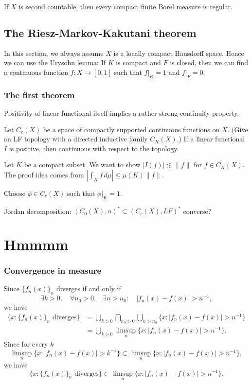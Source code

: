 \documentclass{../crs}
\begin{document}
\begin{thm}
If $X$ is second countable, then every compact finite Borel measure is regular.
\end{thm}




\section{The Riesz-Markov-Kakutani theorem}
In this section, we always assume $X$ is a locally compact Hausdorff space.
Hence we can use the Urysohn lemma: If $K$ is compact and $F$ is closed, then we can find a continuous function $f:X\to[0,1]$ such that $f|_K=1$ and $f|_F=0$.
\subsection{The first theorem}
Positivity of linear functional itself implies a rather strong continuity property.
\begin{thm}
Let $C_c(X)$ be a space of compactly supported continuous functions on $X$.
(Give an LF topology with a directed inductive family $C_K(X)$.)
If a linear functional $I$ is positive, then continuous with respect to the topology.
\end{thm}
\begin{pf}
Let $K$ be a compact subset.
We want to show $|I(f)|\lesssim\|f\|$ for $f\in C_K(X)$.
The proof idea comes from $|\int_K f\,d\mu|\le\mu(K)\|f\|$.

Choose $\phi\in C_c(X)$ such that $\phi|_K=1$.
\end{pf}





Jordan decomposition: $(C_0(X),u)^*\subset(C_c(X),LF)^*$
converse?




\chapter{Hmmmm}

\subsection{Convergence in measure}
Since $\{f_n(x)\}_n$ diverges if and only if
\[\exists k>0,\quad\forall n_0>0.\quad\exists n>n_0:\quad |f_n(x)-f(x)|>n^{-1},\]
we have
\begin{align*}
\{x:\{f_n(x)\}_n\text{ diverges}\}&=\bigcup_{k>0}\bigcap_{n_0>0}\bigcup_{n>n_0}\{x:|f_n(x)-f(x)|>n^{-1}\}\\
&=\bigcup_{k>0}\limsup_n\{x:|f_n(x)-f(x)|>n^{-1}\}.
\end{align*}
Since for every $k$
\[\limsup_n\{x:|f_n(x)-f(x)|>k^{-1}\}\subset\limsup_n\{x:|f_n(x)-f(x)|>n^{-1}\},\]
we have
\[\{x:\{f_n(x)\}_n\text{ diverges}\}\subset\limsup_n\{x:|f_n(x)-f(x)|>n^{-1}\}.\]
\end{document}
